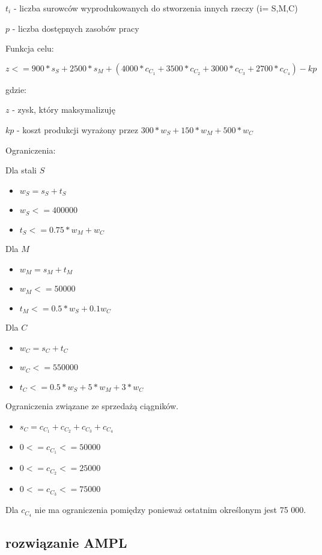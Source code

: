 \documentclass{article}
\begin{document}
$t_i$ - liczba surowców wyprodukowanych do stworzenia innych rzeczy (i= S,M,C)

$p$ - liczba dostępnych zasobów pracy

Funkcja celu:

$z <= 900 * s_S + 2500 * s_M + (4000 * c_C_1 + 3500 * c_C_2 + 3000 * c_C_3 + 2700 * c_C_4) - kp$

gdzie:

$z$ - zysk, który maksymalizuję

$kp$ - koszt produkcji wyrażony przez $300 * w_S + 150 * w_M + 500 * w_C$

Ograniczenia:

Dla stali $S$

\begin{itemize}
  \item $w_S = s_S + t_S$
  \item $w_S <= 400000$
  \item $t_S <= 0.75 * w_M + w_C$
\end{itemize}

Dla $M$

\begin{itemize}
  \item $w_M = s_M + t_M$
  \item $w_M <= 50000$
  \item $t_M <= 0.5 * w_S + 0.1 w_C$
\end{itemize}

Dla $C$

\begin{itemize}
  \item $w_C = s_C + t_C$
  \item $w_C <= 550000$
  \item $t_C <= 0.5 * w_S + 5 * w_M + 3 * w_C$
\end{itemize}


Ograniczenia związane ze sprzedażą ciągników.

\begin{itemize}
  \item $s_C = c_C_1 + c_C_2 + c_C_3 + c_C_4$
  \item $0 <= c_C_1 <= 50 000$
  \item $0 <= c_C_2 <= 25 000$
  \item $0 <= c_C_3 <= 75 000$
\end{itemize}

Dla $c_C_4$ nie ma ograniczenia pomiędzy ponieważ ostatnim określonym jest 75 000.


\subsection{rozwiązanie AMPL}
\end{document}
